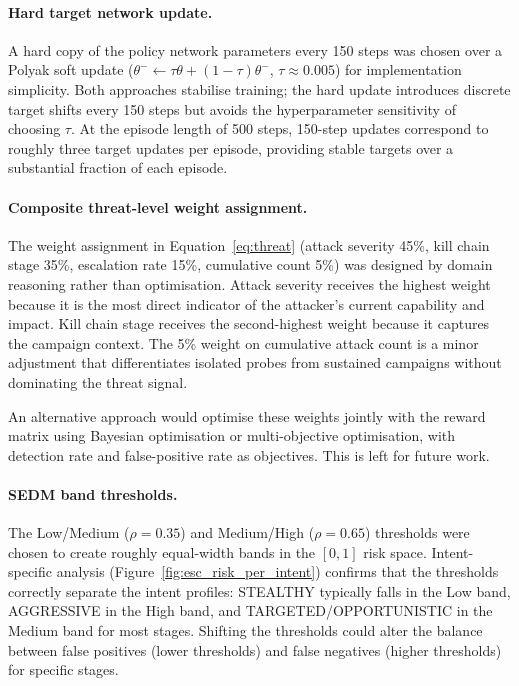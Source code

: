 \paragraph{Hard target network update.}
A hard copy of the policy network parameters every 150 steps was chosen
over a Polyak soft update ($\theta^- \leftarrow \tau\theta + (1-\tau)\theta^-$,
$\tau \approx 0.005$) for implementation simplicity.
Both approaches stabilise training; the hard update introduces discrete
target shifts every 150 steps but avoids the hyperparameter sensitivity
of choosing $\tau$.
At the episode length of 500 steps, 150-step updates correspond to roughly
three target updates per episode, providing stable targets over a substantial
fraction of each episode.

\paragraph{Composite threat-level weight assignment.}
The weight assignment in Equation~\ref{eq:threat} (attack severity 45\%,
kill chain stage 35\%, escalation rate 15\%, cumulative count 5\%) was
designed by domain reasoning rather than optimisation.
Attack severity receives the highest weight because it is the most direct
indicator of the attacker's current capability and impact.
Kill chain stage receives the second-highest weight because it captures the
campaign context.
The 5\% weight on cumulative attack count is a minor adjustment that
differentiates isolated probes from sustained campaigns without dominating
the threat signal.

An alternative approach would optimise these weights jointly with the reward
matrix using Bayesian optimisation or multi-objective optimisation, with
detection rate and false-positive rate as objectives.
This is left for future work.

\paragraph{SEDM band thresholds.}
The Low/Medium ($\rho = 0.35$) and Medium/High ($\rho = 0.65$) thresholds
were chosen to create roughly equal-width bands in the $[0, 1]$ risk space.
Intent-specific analysis (Figure~\ref{fig:esc_risk_per_intent}) confirms
that the thresholds correctly separate the intent profiles: STEALTHY
typically falls in the Low band, AGGRESSIVE in the High band, and
TARGETED/OPPORTUNISTIC in the Medium band for most stages.
Shifting the thresholds could alter the balance between false positives
(lower thresholds) and false negatives (higher thresholds) for specific
stages.

